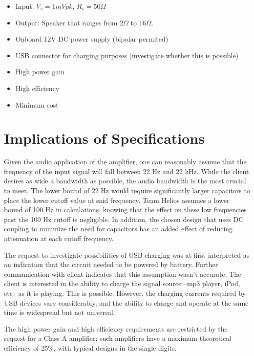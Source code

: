 \documentclass[journal]{IEEEtran}
\begin{document}
\begin{itemize}
\item
Input:  $V_{s}=1 mVpk$, $R_{s}=50\Omega$
\item
Output: Speaker that ranges from $2\Omega$ to $16\Omega$.
\item
Onboard 12V DC power supply (bipolar permited)
\item
USB connector for charging purposes (investigate whether this is possible)
\item
High power gain
\item
High efficiency
\item
Minimum cost
\end{itemize}


\section{Implications of Specifications}

Given the audio application of the amplifier, one can reasonably assume that the frequency of the input signal will fall between 22 Hz and 22 kHz. While the client desires as wide a bandwidth as possible, the audio bandwidth is the most crucial to meet. The lower bound of 22 Hz would require significantly larger capacitors to place the lower cutoff value at said frequency. Team Helios assumes a lower bound of 100 Hz in calculations, knowing that the effect on these low frequencies past the 100 Hz cutoff is negligible. In addition, the chosen design that uses DC coupling to minimize the need for capacitors has an added effect of reducing attenuation at each cutoff frequency.

The request to investigate possibilities of USB charging was at first interpreted as an indication that the circuit needed to be powered by battery. Further communication with client indicates that this assumption wasn't accurate. The client is interested in the ability to charge the signal source --mp3 player, iPod, etc-- as it is playing. This is possible. However, the charging currents required by USB devices vary considerably, and the ability to charge and operate at the same time is widespread but not universal.

The high power gain and high efficiency requirements are restricted by the request for a Class A amplifier; such amplifiers have a maximum theoretical efficiency of 25\%, with typical designs in the single digits.
\end{document}
